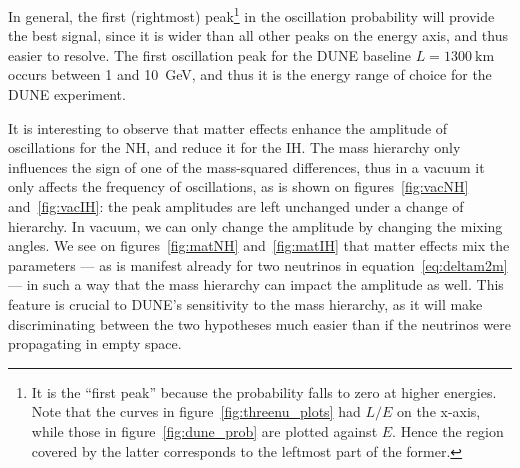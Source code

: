 In general, the first (rightmost) peak\footnote{It is the ``first peak''
because the probability falls to zero at higher energies. Note that the curves
in figure~\ref{fig:threenu_plots} had $L/E$ on the x-axis, while those in
figure~\ref{fig:dune_prob} are plotted against $E$. Hence the region covered by
the latter corresponds to the leftmost part of the former.} in the oscillation
probability will provide the best signal, since it is wider than all other
peaks on the energy axis, and thus easier to resolve.
The first oscillation peak for the DUNE baseline $L=\SI{1300}{\km}$ occurs between 1 and
\SI{10}{\GeV}, and thus it is the
energy range of choice for the DUNE experiment\cite{cdr}. 

It is interesting to observe that matter effects enhance the amplitude of
oscillations for the NH, and reduce it for the IH. The mass hierarchy only
influences the sign of one of the mass-squared differences, thus in a vacuum it
only affects the frequency of oscillations, as is shown on
figures~\ref{fig:vacNH} and~\ref{fig:vacIH}: the peak amplitudes are left
unchanged under a change of hierarchy. In vacuum, we can only change the
amplitude by changing the mixing angles. We see on figures~\ref{fig:matNH}
and~\ref{fig:matIH} that matter effects mix the parameters --- as is manifest
already for two neutrinos in equation~\ref{eq:deltam2m} --- in such a way that the
mass hierarchy can impact the amplitude as well. This feature is crucial to
DUNE's sensitivity to the mass hierarchy, as it will make discriminating
between the two hypotheses much easier than if the neutrinos were propagating
in empty space.

